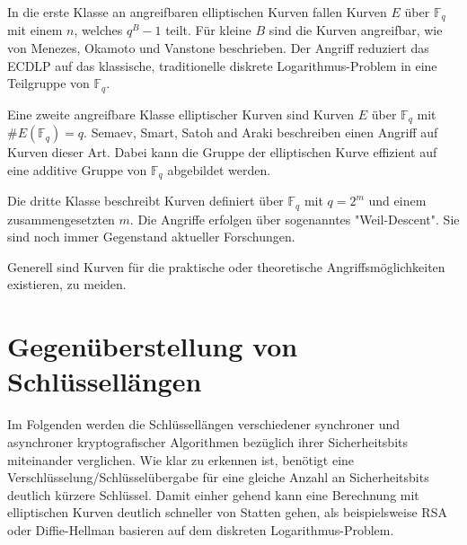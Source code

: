 In die erste Klasse an angreifbaren elliptischen Kurven fallen Kurven $E$ über $\mathbb{F}_q$ mit einem $n$, welches 
$q^B -1$ teilt. Für kleine $B$ sind die Kurven angreifbar, wie von Menezes, Okamoto und Vanstone beschrieben\cite{ecc_attack1}.
Der Angriff reduziert das ECDLP auf das klassische, traditionelle diskrete Logarithmus-Problem in eine Teilgruppe von $\mathbb{F}_q$.

Eine zweite angreifbare Klasse elliptischer Kurven sind Kurven $E$ über $\mathbb{F}_q$ mit $\#E(\mathbb{F}_q) = q$.
Semaev\cite{ecc_attack2}, Smart\cite{ecc_attack2b}, Satoh and Araki\cite{ecc_attack2b} beschreiben einen Angriff auf Kurven dieser Art. Dabei kann die Gruppe der elliptischen
Kurve effizient auf eine additive Gruppe von $\mathbb{F}_q$ abgebildet werden.

Die dritte Klasse beschreibt Kurven definiert über $\mathbb{F}_q$ mit $q = 2^m$ und einem zusammengesetzten $m$.
Die Angriffe erfolgen über sogenanntes "Weil-Descent"\cite{ecc_attack3}. Sie sind noch immer Gegenstand aktueller Forschungen.

Generell sind Kurven für die praktische oder theoretische Angriffsmöglichkeiten existieren, zu meiden.

\newpage

\section{Gegenüberstellung von Schlüssellängen}

Im Folgenden werden die Schlüssellängen verschiedener synchroner und asynchroner kryptografischer Algorithmen
bezüglich ihrer Sicherheitsbits miteinander verglichen.\cite{security_bits}
Wie klar zu erkennen ist, benötigt eine Verschlüsselung/Schlüsselübergabe für eine gleiche Anzahl an Sicherheitsbits
deutlich kürzere Schlüssel. Damit einher gehend kann eine Berechnung mit elliptischen Kurven deutlich schneller von Statten gehen,
als beispielsweise RSA oder Diffie-Hellman basieren auf dem diskreten Logarithmus-Problem.

